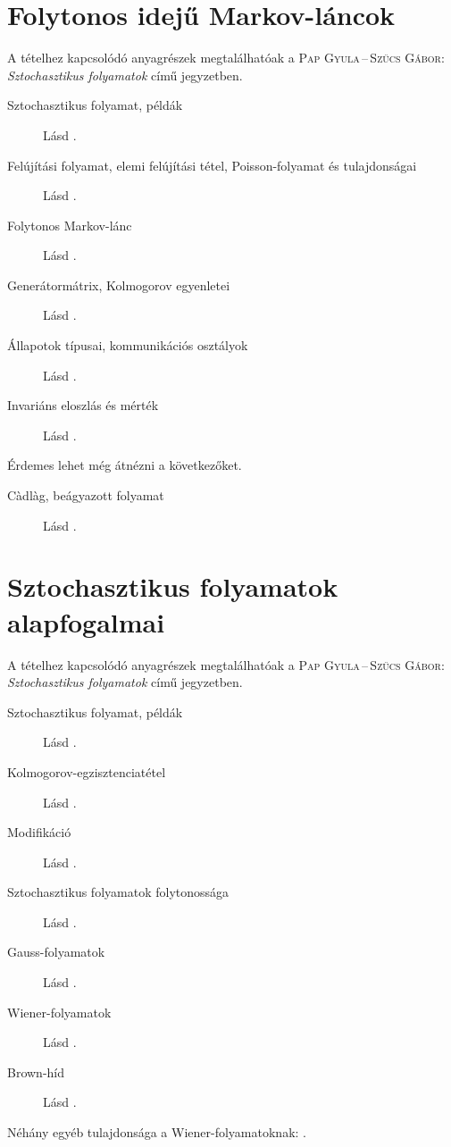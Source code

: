 \documentclass[%
	DIV=15,appendixprefix]{scrreprt}
\theoremstyle{definition}
\theoremstyle{remark}
\begin{document}
\section{Folytonos idejű Markov-láncok}
A tételhez kapcsolódó anyagrészek megtalálhatóak a \textsc{Pap Gyula\,--\,Szűcs Gábor}:
\emph{Sztochasztikus folyamatok} \cite{PapSzucs} című jegyzetben.
%
\begin{description}
	\item[Sztochasztikus folyamat, példák] Lásd \cite[3--4.~oldal]{PapSzucs}.
	\item[Felújítási folyamat, elemi felújítási tétel, Poisson-folyamat és tulajdonságai] Lásd
		\cite[74--77.~oldal]{PapSzucs}.
	\item[Folytonos Markov-lánc] Lásd \cite[83--85.~oldal]{PapSzucs}.
	\item[Generátormátrix, Kolmogorov egyenletei] Lásd \cite[86--90.~oldal]{PapSzucs}.
	\item[Állapotok típusai, kommunikációs osztályok] Lásd
		\cite[100--102.~oldal]{PapSzucs}.
	\item[Invariáns eloszlás és mérték] Lásd \cite[103--106.~oldal]{PapSzucs}.
\end{description}
Érdemes lehet még átnézni a következőket.
\begin{description}
	\item[C\`adl\`ag, beágyazott folyamat] Lásd \cite[93--95.~oldal]{PapSzucs}.
\end{description}
%
\section{Sztochasztikus folyamatok alapfogalmai}
A tételhez kapcsolódó anyagrészek megtalálhatóak a \textsc{Pap Gyula\,--\,Szűcs Gábor}:
\emph{Sztochasztikus folyamatok} \cite{PapSzucs} című jegyzetben.
%
\begin{description}
	\item[Sztochasztikus folyamat, példák] Lásd \cite[3--4.~oldal]{PapSzucs}.
	\item[Kolmogorov-egzisztenciatétel] Lásd \cite[110--111.~oldal]{PapSzucs}.
	\item[Modifikáció] Lásd \cite[111--113.~oldal]{PapSzucs}.
	\item[Sztochasztikus folyamatok folytonossága] Lásd \cite[116.~oldal]{PapSzucs}.
	\item[Gauss-folyamatok] Lásd \cite[122--123.~oldal]{PapSzucs}.
	\item[Wiener-folyamatok] Lásd \cite[124--125.~oldal]{PapSzucs}.
	\item[Brown-híd] Lásd \cite[126.~oldal]{PapSzucs}.
\end{description}
Néhány egyéb tulajdonsága a Wiener-folyamatoknak: \cite[106--111.~dia]{Szucs}.
%
\end{document}
